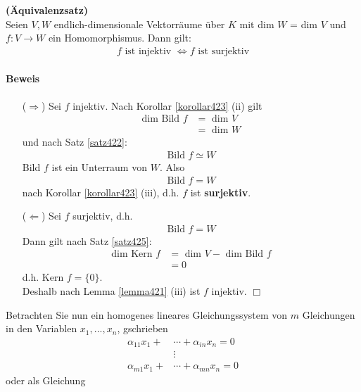 \documentclass[11pt]{report}
\newcommand*\f[1] {\textbf{#1}}
\begin{document}
\begin{satz} \f{(Äquivalenzsatz)} \\
\label{satz426}
Seien $V, W$ endlich-dimensionale Vektorräume über $K$ mit dim $W$ = dim $V$ und $f: V \rightarrow W$ ein Homomorphismus. Dann gilt:
\begin{align}
f \text{ ist injektiv } \Leftrightarrow f \text{ ist surjektiv} 
\end{align}
\end{satz}
\paragraph{Beweis}
\begin{itemize}
 \item[($\Rightarrow$)] Sei $f$ injektiv. Nach Korollar \ref{korollar423} (ii) gilt 
\begin{align}
 \text{dim Bild } f &= \text{ dim } V \\
 &= \text{ dim } W
\end{align}
und nach Satz \ref{satz422}:
\begin{align}
 \text{Bild } f \simeq W 
\end{align}
Bild $f$ ist ein Unterraum von $W$. Also
\begin{align}
 \text{Bild } f = W
\end{align}
nach Korollar \ref{korollar423} (iii), d.h. $f$ ist \f{surjektiv}.

 \item[($\Leftarrow$)] Sei $f$ surjektiv, d.h.
\begin{align}
 \text{Bild } f = W
\end{align}
Dann gilt nach Satz \ref{satz425}:
\begin{align}
 \text{dim Kern } f &= \text{ dim } V - \text{ dim Bild } f \\
&= 0
\end{align}
d.h. Kern $f = \{0\}$. \\ Deshalb nach Lemma \ref{lemma421} (iii) ist $f$ injektiv. \hfill $\Box$
\end{itemize}
Betrachten Sie nun ein homogenes lineares Gleichungssystem von $m$ Gleichungen in den Variablen $x_1, ..., x_n$, gschrieben
\begin{align}
 \alpha_{11} x_1 + &\cdots + \alpha_{in} x_n = 0 \\
 &\vdots \\
 \alpha_{m1} x_1 + &\cdots + \alpha_{mn} x_n = 0
\end{align}
oder als Gleichung
\end{document}
